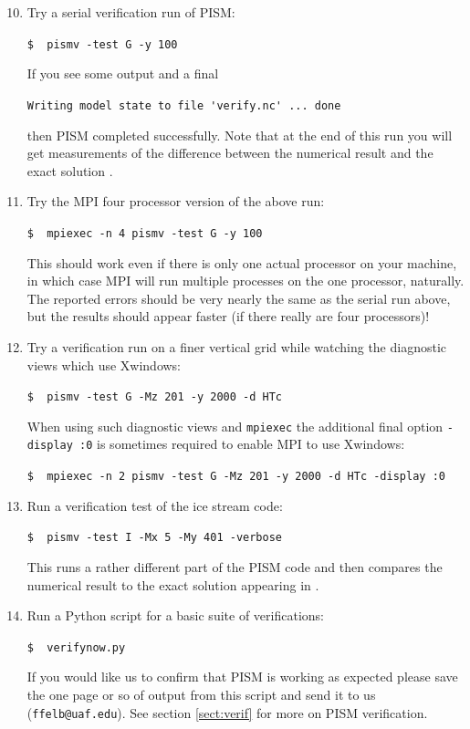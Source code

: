 \documentclass[11pt,final]{amsart}
\begin{document}
\begin{enumerate}\setcounter{enumi}{9}
\item \label{serialpismvrun} Try a serial verification run of PISM:

\verb|$  pismv -test G -y 100|

\noindent If you see some output and a final 

\verb|Writing model state to file 'verify.nc' ... done|

\noindent then PISM completed successfully.  Note that at the end of this run you will get measurements of the difference between the numerical result and the exact solution \cite{BBL}.

\item Try the MPI four processor version of the above run:

\verb|$  mpiexec -n 4 pismv -test G -y 100|

\noindent This should work even if there is only one actual processor on your machine, in which case MPI will run multiple processes on the one processor, naturally.  The reported errors should be very nearly the same as the serial run above, but the results should appear faster (if there really are four processors)!

\item Try a verification run on a finer vertical grid while watching the diagnostic views which use Xwindows:

\verb|$  pismv -test G -Mz 201 -y 2000 -d HTc|

\noindent When using such diagnostic views and \verb|mpiexec| the additional final option \verb|-display :0| is sometimes required to enable MPI to use Xwindows:

\verb|$  mpiexec -n 2 pismv -test G -Mz 201 -y 2000 -d HTc -display :0|

\item Run a verification test of the ice stream code:

\verb|$  pismv -test I -Mx 5 -My 401 -verbose|

\noindent This runs a rather different part of the PISM code and then compares the numerical result to the exact solution appearing in \cite{SchoofStream}.

\item Run a Python script for a basic suite of verifications:

\verb|$  verifynow.py|

\noindent If you would like us to confirm that PISM is working as expected please save the one page or so of output from this script and send it to us (\verb|ffelb@uaf.edu|).  See section \ref{sect:verif} for more on PISM verification.
\end{enumerate}
\bigskip
\end{document}

